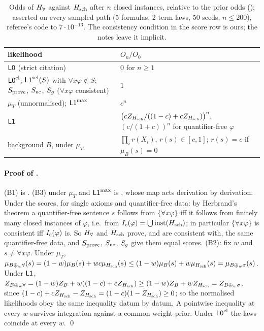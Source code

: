 \begin{table}[ht]
\centering\small
\begin{tabularx}{\textwidth}{@{}>{\raggedright\arraybackslash}p{}X@{}}
\toprule
likelihood & $O_n/O_0$\\
\midrule
$\mathord{\mathsf{L0}}$ (strict citation) & $0$ for $n\ge1$\\
$\mathord{\mathsf{L0}}^{\mathrm{cl}}$; $\mathord{\mathsf{L1}}^{\mathrm{sel}}(S)$ with $\forall x\varphi\notin S$; $S_{\mathrm{prove}}$, $S_{\mathrm{nc}}$, $S_{g}$ ($\forall x\varphi$ consistent) & $1$\\
$\mu_T$ (unnormalised); $\mathord{\mathsf{L1}}^{\max}$ & $c^n$\\
$\mathord{\mathsf{L1}}$ & $\big(cZ_{H_{\mathrm{sch}}}/((1-c)+cZ_{H_{\mathrm{sch}}})\big)^n$; $(c/(1+c))^n$ for quantifier-free $\varphi$\\
background $B$, under $\mu_T$ & $\prod_ir(X_i)$, $r(s)\in[c,1]$; $r(s)=c$ if $\mu_B(s)=0$\\
\bottomrule
\end{tabularx}
\caption{Odds of $H_{\forall}$ against $H_{\mathrm{sch}}$ after $n$ closed instances, relative to the prior odds (); asserted on every sampled path (5 formulas, 2 term laws, 50 seeds, $n\le200$), referee's code to $7\cdot10^{-13}$. The consistency condition in the score row is ours; the notes leave it implicit.}
\label{tab:univ:odds}
\end{table}

\paragraph{Proof of .} (B1) is . (B3) under $\mu_T$ and $\mathord{\mathsf{L1}}^{\max}$ is , whose map acts derivation by derivation. Under the scores, for single axioms and quantifier-free data: by Herbrand's theorem a quantifier-free sentence $s$ follows from $\{\forall x\varphi\}$ iff it follows from finitely many closed instances of $\varphi$, i.e.\ from $I_{\mathrm{c}}(\varphi)=\bigcup\mathrm{inst}(H_{\mathrm{sch}})$; in particular $\{\forall x\varphi\}$ is consistent iff $I_{\mathrm{c}}(\varphi)$ is. So $H_{\forall}$ and $H_{\mathrm{sch}}$ prove, and are consistent with, the same quantifier-free data, and $S_{\mathrm{prove}}$, $S_{\mathrm{nc}}$, $S_{g}$ give them equal scores. (B2): fix $w$ and $s\neq\forall x\varphi$. Under $\mu_T$, $\mu_{B\oplus_w\forall}(s)=(1-w)\mu_B(s)+wc\mu_{H_{\mathrm{sch}}}(s)\le(1-w)\mu_B(s)+w\mu_{H_{\mathrm{sch}}}(s)=\mu_{B\oplus_w\sigma}(s)$. Under $\mathord{\mathsf{L1}}$, $Z_{B\oplus_w\forall}=(1-w)Z_B+w((1-c)+cZ_{H_{\mathrm{sch}}})\ge(1-w)Z_B+wZ_{H_{\mathrm{sch}}}=Z_{B\oplus_w\sigma}$, since $(1-c)+cZ_{H_{\mathrm{sch}}}-Z_{H_{\mathrm{sch}}}=(1-c)(1-Z_{H_{\mathrm{sch}}})\ge0$; so the normalised likelihoods obey the same inequality datum by datum. A pointwise inequality at every $w$ survives integration against a common weight prior. Under $\mathord{\mathsf{L0}}^{\mathrm{cl}}$ the laws coincide at every $w$. \qed


